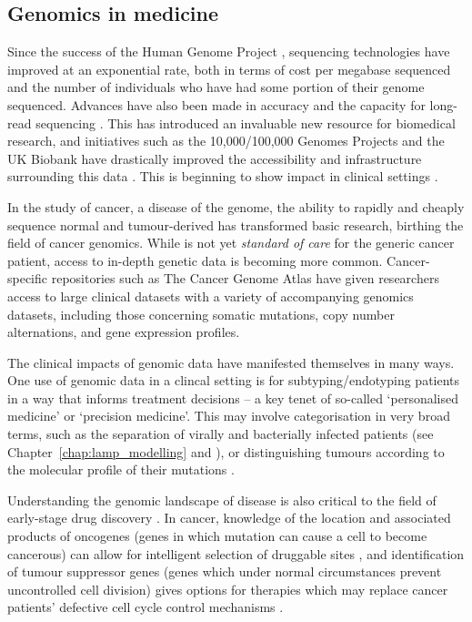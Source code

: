 \documentclass[thesis.tex]{subfiles}
\begin{document}
\subsection{Genomics in medicine}
Since the success of the Human Genome Project \citep{lander_initial_2001}, sequencing technologies
have improved at an exponential rate, both in terms of cost per megabase
sequenced \citep{wetterstrand_dna_2022} and the number of individuals who have had some portion of
their genome sequenced. Advances have also been made in accuracy and the capacity for long-read sequencing \citep{goldfeder_human_2017}. This has introduced an invaluable new resource
for biomedical research, and initiatives such as the 10,000/100,000 Genomes Projects \citep{telenti_deep_2016} and the UK Biobank \citep{bycroft_uk_2018} have drastically improved the accessibility and infrastructure surrounding this data \citep{szustakowski_advancing_2021}. This is beginning to show impact in clinical settings \citep{prokop_genome_2018}. 

In the study of cancer, a disease of the
genome, the ability to rapidly and cheaply sequence normal and tumour-derived  has transformed basic research, birthing the field of cancer
genomics. While  is not yet \emph{standard of care} for the generic cancer patient,
access to in-depth genetic data is becoming more common. Cancer-specific repositories such as The Cancer Genome Atlas \citep{weinstein_cancer_2013} have given
researchers access to large clinical datasets with a variety of accompanying
genomics datasets, including those concerning somatic mutations, copy number alternations, and gene expression profiles. 

The clinical impacts of genomic data have manifested themselves in many ways. One use of genomic data in a clincal setting is for subtyping/endotyping patients in a way that informs treatment decisions -- a key tenet of so-called `personalised medicine' or `precision medicine'. This may involve categorisation in very broad terms, such as the separation of virally and bacterially infected patients (see Chapter~\ref{chap:lamp_modelling} and \citealp{remmel_diagnostic_2022}), or distinguishing tumours according to the molecular profile of their mutations \citep{zhao_molecular_2019}.

Understanding the genomic landscape of disease is also critical to the field of early-stage drug discovery \citep{nelson_support_2015, raja_integrating_2017, king_are_2019}. In cancer, knowledge of the location and associated products of oncogenes (genes in which mutation can cause a cell to become cancerous) can allow for intelligent selection of druggable sites \citep{weinstein_cancer_2002, bedard_small_2020}, and identification of tumour suppressor genes (genes which under normal circumstances prevent uncontrolled cell division) gives options for therapies which may replace cancer patients' defective cell cycle control mechanisms \citep{fang_tumor-suppressing_2003, morris_therapeutic_2015}. 
\end{document}
